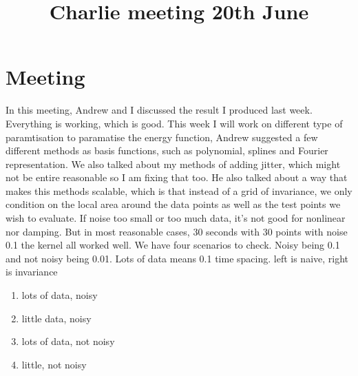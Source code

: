 \documentclass{article}
\title{\vspace{-3cm}Charlie meeting 20th June\vspace{-3em}}
\author{}
\date{}
\begin{document}
\maketitle
\section*{Meeting}
In this meeting, Andrew and I discussed the result I produced last week. 
Everything is working, which is good. 
This week I will work on different type of paramtisation to paramatise the energy function, Andrew suggested a few different methods as basis functions, such as polynomial, splines and Fourier representation. 
We also talked about my methods of adding jitter, which might not be entire reasonable so I am fixing that too. 
He also talked about a way that makes this methods scalable, which is that instead of a grid of invariance, we only condition on the local area around the data points as well as the test points we wish to evaluate. 
If noise too small or too much data, it's not good for nonlinear nor damping.
But in most reasonable cases, 30 seconds with 30 points with noise 0.1 the kernel all worked well.
We have four scenarios to check.
Noisy being 0.1 and not noisy being 0.01. Lots of data means 0.1 time spacing.
left is naive, right is invariance
\begin{enumerate}
  \item lots of data, noisy
  \item little data, noisy
  \item lots of data, not noisy
  \item little, not noisy
\end{enumerate}
\begin{flushleft}
\end{flushleft}
\end{document}
